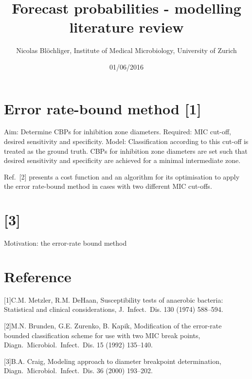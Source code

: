 \documentclass[a4paper]{article}
\title{Forecast probabilities - modelling literature review}
\author{Nicolas Blöchliger, Institute of Medical Microbiology, University of
Zurich}
\date{01/06/2016}
\begin{document}
\maketitle


{
\hypersetup{linkcolor=black}
\setcounter{tocdepth}{2}
\tableofcontents
}
\section{Error rate-bound method
{[}1{]}}\label{error-rate-bound-method-metzler1974}

Aim: Determine CBPs for inhibition zone diameters. Required: MIC
cut-off, desired sensitivity and specificity. Model: Classification
according to this cut-off is treated as the ground truth. CBPs for
inhibition zone diameters are set such that desired sensitivity and
specificity are achieved for a minimal intermediate zone.

Ref.~{[}2{]} presents a cost function and an algorithm for its
optimisation to apply the error rate-bound method in cases with two
different MIC cut-offs.

\section{{[}3{]}}\label{craig2000}

Motivation: the error-rate bound method

\section*{Reference}\label{reference}

{[}1{]}C.M. Metzler, R.M. DeHaan, Susceptibility tests of anaerobic
bacteria: Statistical and clinical considerations, J.~Infect.~Dis. 130
(1974) 588--594.

{[}2{]}M.N. Brunden, G.E. Zurenko, B. Kapik, Modification of the
error-rate bounded classification scheme for use with two MIC break
points, Diagn.~Microbiol.~Infect.~Dis. 15 (1992) 135--140.

{[}3{]}B.A. Craig, Modeling approach to diameter breakpoint
determination, Diagn.~Microbiol.~Infect.~Dis. 36 (2000) 193--202.
\end{document}
